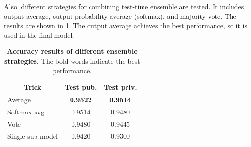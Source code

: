 \documentclass[10pt,twocolumn,letterpaper]{article}
\begin{document}
Also, different strategies for combining test-time ensemble are tested. It
includes output average, output probability average (softmax), and majority
vote. The results are shown in \cref{tab:ensemble}. The output
average achieves the best performance, so it is used in the final model.

\begin{table}[h]
  \centering
  \begin{tabular}{lcc}
  \toprule
  \multicolumn{1}{c}{\textbf{Trick}} & \textbf{Test pub.} & \textbf{Test priv.} \\
  \midrule
  Average                            & \textbf{0.9522}    & \textbf{0.9514}     \\
  Softmax avg.                       & 0.9514             & 0.9480              \\
  Vote                               & 0.9480             & 0.9445              \\
  Single sub-model                   & 0.9420             & 0.9300              \\
  \bottomrule
  \end{tabular}
  \caption{\textbf{Accuracy results of different ensemble strategies.} The bold 
    words indicate the best performance.}
  \label{tab:ensemble}
\end{table}

{\small


}
\end{document}
